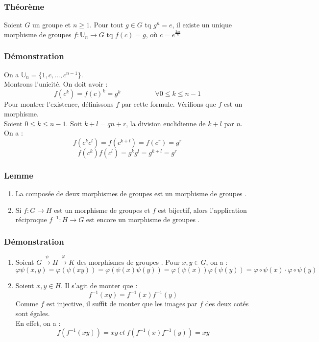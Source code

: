 \documentclass[a4paper, oneside]{report}
\newcommand{\U}{\mathbb{U}}
\newcommand{\mdg}{morphisme de groupes }
\newcommand{\mdgs}{morphismes de groupes }
\begin{document}
\subsubsection{Théorème}
Soient $G$ un groupe et $n\geq 1$. Pour tout $g\in G$ tq $g^n=e$, il existe un unique \mdg $f:\U_n \rightarrow G$ tq $f(c)=g$, où $c=e^{\frac{2\pi i}{n}}$

\subsubsection{Démonstration}
On a $\U_n = \{1,c,...,c^{n-1}\}$.\\
Montrons l'unicité. On doit avoir :
$$f(c^k)=f(c)^k=g^k\hspace{5em}\forall 0\leq k \leq n-1$$
Pour montrer l'existence, définissons $f$ par cette formule. Vérifions que $f$ est un morphisme.\\
Soient $0\leq k\leq n-1$. Soit $k+l=qn+r$, la division euclidienne de $k+l$ par $n$. On a :
$$f(c^kc^l)= f(c^{k+l})=f(c^r)=g^r$$
$$f(c^k)f(c^l)=g^kg^l=g^{k+l}=g^r$$

\subsubsection{Lemme}
\begin{enumerate}
\item La composée de deux \mdgs est un \mdg.
\item Si $f:G\rightarrow H$ est un \mdg et $f$ est bijectif, alors l'application réciproque $f^{-1}:H\rightarrow G$ est encore un \mdg.
\end{enumerate}

\subsubsection{Démonstration}
\begin{enumerate}
\item Soient $G\overset{\psi}{\rightarrow} H \overset{\varphi}{\rightarrow} K$ des \mdgs. Pour $x,y\in G$, on a :
$$\varphi\psi (x,y)=\varphi (\psi (xy))=\varphi (\psi(x)\psi(y)) = \varphi(\psi (x))\varphi(\psi(y))=\varphi\circ \psi(x)\cdot \varphi \circ \psi(y)$$
\item Soient $x,y\in H$. Il s'agit de monter que :
$$f^{-1}(xy)=f^{-1}(x)f^{-1}(y)$$
Comme $f$ est injective, il suffit de monter que les images par $f$ des deux cotés sont égales.\\
En effet, on a :
$$f(f^{-1}(xy))=xy~et~f(f^{-1}(x)f^{-1}(y))=xy$$
\end{enumerate}
\end{document}
